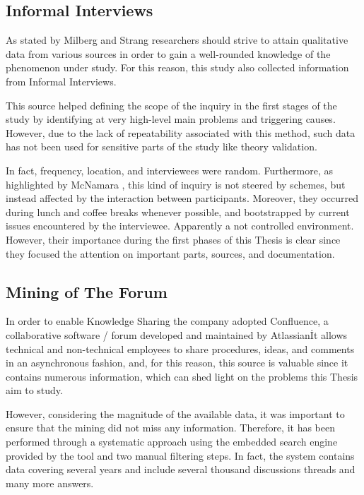 
\subsection{Informal Interviews}
As stated by Milberg and Strang \cite{informal_interview} researchers should strive to attain qualitative data from various sources in order to gain a well-rounded knowledge of the phenomenon under study. For this reason, this study also collected information from Informal Interviews.

This source helped defining the scope of the inquiry in the first stages of the study by identifying at very high-level main problems and triggering causes. However, due to the lack of repeatability associated with this method, such data has not been used for sensitive parts of the study like theory validation.

In fact, frequency, location, and interviewees were random. Furthermore, as highlighted by McNamara \cite{general_guidelines_for_interview}, this kind of inquiry is not steered by schemes, but instead affected by the interaction between participants. Moreover, they occurred during lunch and coffee breaks whenever possible, and bootstrapped by current issues encountered by the interviewee. Apparently a not controlled environment. However, their importance during the first phases of this Thesis is clear since they focused the attention on important parts, sources, and documentation.

\subsection{Mining of The Forum} \label{mining_forum}
In order to enable Knowledge Sharing the company adopted Confluence, a collaborative software / forum developed and maintained by Atlassian\texttrademark\. It allows technical and non-technical employees to share procedures, ideas, and comments in an asynchronous fashion, and, for this reason, this source is valuable since it contains numerous information, which can shed light on the problems this Thesis aim to study.

However, considering the magnitude of the available data, it was important to ensure that the mining did not miss any information. Therefore, it has been performed through a systematic approach using the embedded search engine provided by the tool and two manual filtering steps. In fact, the system contains data covering several years and include several thousand discussions threads and many more answers.

